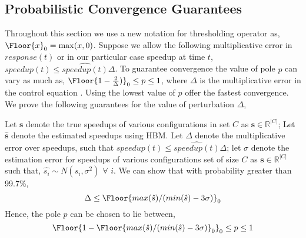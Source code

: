 \subsection*{Probabilistic Convergence Guarantees}
Throughout this section we use a new notation for thresholding
operator as, $\Floor{x}_0 = \max(x,0)$. Suppose we allow the following
multiplicative error in $response(t)$ or in our particular case
speedup at time $t$, $speedup(t) \leq \hat{speedup(t)} \Delta$.  To
guarantee convergence the value of pole $p$ can vary as much as,
$\Floor{1-\frac{2}{\Delta})}_0\leq p \leq 1$, where $\Delta$ is the
multiplicative error in the control equation \cite{ICSE2014}. Using
the lowest value of $p$ offer the fastest convergence. We prove the
following guarantees for the value of perturbation $\Delta$,

\begin{theorem}
  Let $\mathbf{s}$ denote the true speedups of various configurations
  in set $C$ as $\mathbf{s} \in \mathbb{R}^{|C|}$; Let
  $\hat{\mathbf{s}}$ denote the estimated speedups using HBM. Let
  $\Delta$ denote the multiplicative error over speedups, such that
  $speedup(t) \leq \hat{speedup(t)}\Delta $; let $\sigma$ denote the
  estimation error for speedups of various configurations set of size
  $C$ as $\mathbf{s} \in \mathbb{R}^{|C|}$ such that, $\hat{s_i} \sim
  N(s_i, \sigma^2)$ $\forall$ $i$. We can show that with probability
  greater than 99.7\%,
$$
\Delta \leq \Floor{max(\hat{s})/(min(\hat{s}) -  3\sigma)}_0
$$
Hence, the pole $p$ can be chosen to lie between, $$\Floor{1- \Floor{max(\hat{s})/(min(\hat{s}) -  3\sigma)}_0}_0 \leq p \leq 1$$
\end{theorem}

